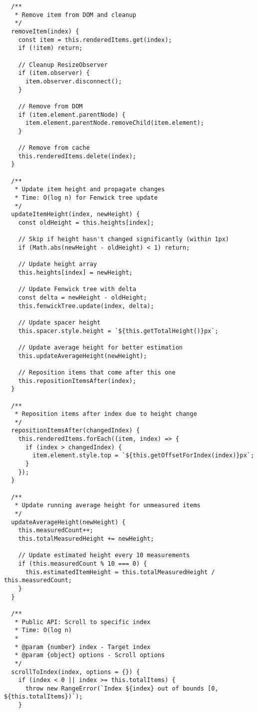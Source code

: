 \documentclass[11pt]{article}
\begin{document}
\begin{verbatim}
  /**
   * Remove item from DOM and cleanup
   */
  removeItem(index) {
    const item = this.renderedItems.get(index);
    if (!item) return;
    
    // Cleanup ResizeObserver
    if (item.observer) {
      item.observer.disconnect();
    }
    
    // Remove from DOM
    if (item.element.parentNode) {
      item.element.parentNode.removeChild(item.element);
    }
    
    // Remove from cache
    this.renderedItems.delete(index);
  }
  
  /**
   * Update item height and propagate changes
   * Time: O(log n) for Fenwick tree update
   */
  updateItemHeight(index, newHeight) {
    const oldHeight = this.heights[index];
    
    // Skip if height hasn't changed significantly (within 1px)
    if (Math.abs(newHeight - oldHeight) < 1) return;
    
    // Update height array
    this.heights[index] = newHeight;
    
    // Update Fenwick tree with delta
    const delta = newHeight - oldHeight;
    this.fenwickTree.update(index, delta);
    
    // Update spacer height
    this.spacer.style.height = `${this.getTotalHeight()}px`;
    
    // Update average height for better estimation
    this.updateAverageHeight(newHeight);
    
    // Reposition items that come after this one
    this.repositionItemsAfter(index);
  }
  
  /**
   * Reposition items after index due to height change
   */
  repositionItemsAfter(changedIndex) {
    this.renderedItems.forEach((item, index) => {
      if (index > changedIndex) {
        item.element.style.top = `${this.getOffsetForIndex(index)}px`;
      }
    });
  }
  
  /**
   * Update running average height for unmeasured items
   */
  updateAverageHeight(newHeight) {
    this.measuredCount++;
    this.totalMeasuredHeight += newHeight;
    
    // Update estimated height every 10 measurements
    if (this.measuredCount % 10 === 0) {
      this.estimatedItemHeight = this.totalMeasuredHeight / this.measuredCount;
    }
  }
  
  /**
   * Public API: Scroll to specific index
   * Time: O(log n)
   * 
   * @param {number} index - Target index
   * @param {object} options - Scroll options
   */
  scrollToIndex(index, options = {}) {
    if (index < 0 || index >= this.totalItems) {
      throw new RangeError(`Index ${index} out of bounds [0, ${this.totalItems})`);
    }
    

\end{verbatim}
\end{document}
